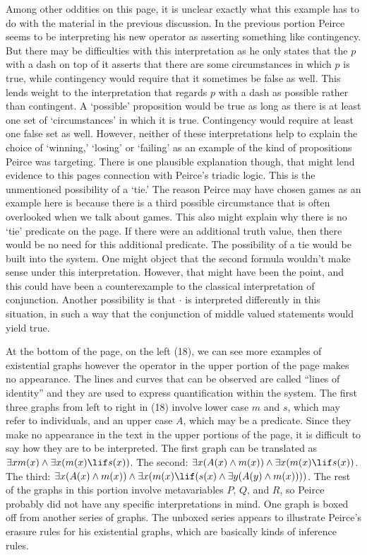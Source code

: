Among other oddities on this page, it is unclear exactly what this example has to do with the material in the previous discussion. In the previous portion Peirce seems to be interpreting his new operator as asserting something like contingency. But there may be difficulties with this interpretation as he only states that the $p$ with a dash on top of it asserts that there are some circumstances in which $p$ is true, while contingency would require that it sometimes be false as well. This lends weight to the interpretation that regards $p$ with a dash as possible rather than contingent. A `possible' proposition would be true as long as there is at least one set of `circumstances' in which it is true. Contingency would require at least one false set as well. However, neither of these interpretations help to explain the choice of `winning,' `losing' or `failing' as an example of the kind of propositions Peirce was targeting. There is one plausible explanation though, that might lend evidence to this pages connection with Peirce's triadic logic. This is the unmentioned possibility of a `tie.' The reason Peirce may have chosen games as an example here is because there is a third possible circumstance that is often overlooked when we talk about games. This also might explain why there is no `tie' predicate on the page. If there were an additional truth value, then there would be no need for this additional predicate. The possibility of a tie would be built into the system. One might object that the second formula wouldn't make sense under this interpretation. However, that might have been the point, and this could have been a counterexample to the classical interpretation of conjunction. Another possibility is that $\cdot$ is interpreted differently in this situation, in such a way that the conjunction of middle valued statements would yield true.

At the bottom of the page, on the left (18), we can see more examples of existential graphs however the operator in the upper portion of the page makes no appearance. The lines and curves that can be observed are called ``lines of identity'' and they are used to express quantification within the system. The first three graphs from left to right in (18) involve lower case $m$ and $s$, which may refer to individuals, and an upper case $A$, which may be a predicate. Since they make no appearance in the text in the upper portions of the page, it is difficult to say how they are to be interpreted. The first graph can be translated as $\exists x m(x) \land \exists x (m(x) \lif s(x))$. The second: $\exists x(A(x) \land m(x)) \land \exists x (m(x) \lif s(x))$. The third: $\exists x (A(x) \land m(x)) \land \exists x (m(x)\lif (s(x) \land \exists y( A(y) \land m(x))))$. The rest of the graphs in this portion involve metavariables $P$, $Q$, and $R$, so Peirce probably did not have any specific interpretations in mind. One graph is boxed off from another series of graphs. The unboxed series appears to illustrate Peirce's erasure rules for his existential graphs, which are basically kinds of inference rules.


